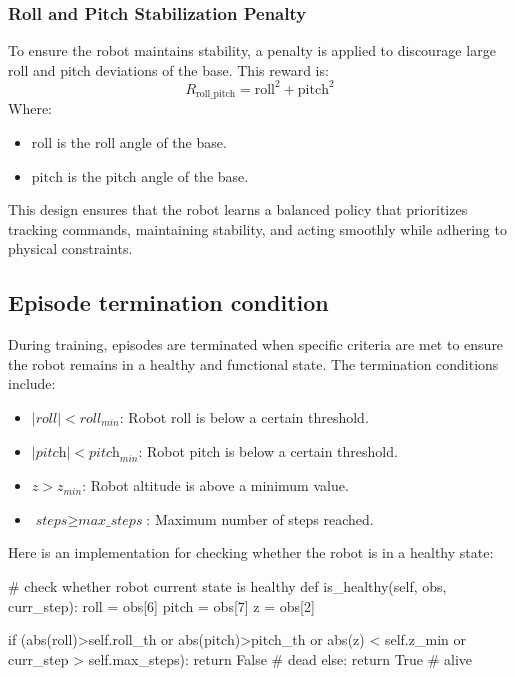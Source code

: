 \subsubsection{Roll and Pitch Stabilization Penalty}

To ensure the robot maintains stability, a penalty is applied to discourage large roll and pitch deviations of the base. This reward is:
\[
R_{\text{roll\_pitch}} = \text{roll}^2 + \text{pitch}^2
\]
Where:
\begin{itemize}
	\item $\text{roll}$ is the roll angle of the base.
	\item $\text{pitch}$ is the pitch angle of the base.
\end{itemize}

This design ensures that the robot learns a balanced policy that prioritizes tracking commands, maintaining stability, and acting smoothly while adhering to physical constraints.

\subsection{Episode termination condition}

During training, episodes are terminated when specific criteria are met to ensure the robot remains in a healthy and functional state. The termination conditions include:

\begin{itemize}
	\item $|\textit{roll}| < \textit{roll}_{\textit{min}}$: Robot roll is below a certain threshold.
	\item $|\textit{pitch}| < \textit{pitch}_{\textit{min}}$: Robot pitch is below a certain threshold.
	\item $z > z_{\textit{min}}$: Robot altitude is above a minimum value.
	\item $\textit{steps} \geq \textit{max\_steps}$: Maximum number of steps reached.
\end{itemize}

Here is an implementation for checking whether the robot is in a healthy state:
\begin{pythoncode}
	# check whether robot current state is healthy
	def is_healthy(self, obs, curr_step):
			roll = obs[6]
			pitch = obs[7]
			z = obs[2]
		
			if (abs(roll)>self.roll_th or abs(pitch)>pitch_th or abs(z) < self.z_min or curr_step > 	self.max_steps):
					return False # dead
			else:
					return True # alive
\end{pythoncode}

